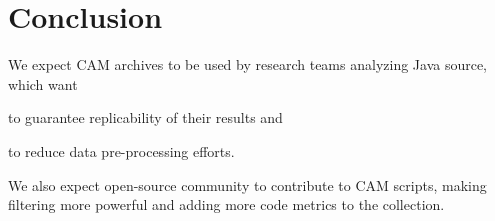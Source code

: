 \documentclass[11pt,sigplan,nonacm]{acmart}
\newcommand\cam{{\sffamily CAM}}
\begin{document}
\section{Conclusion}

We expect \cam{} archives to be used by research teams analyzing Java source, which want
\begin{inparaenum}[(a)]
\item to guarantee replicability of their results
and
\item to reduce data pre-processing efforts.
\end{inparaenum}
We also expect open-source community to contribute to \cam{} scripts, making filtering more powerful and adding more code metrics to the collection.



\end{document}
